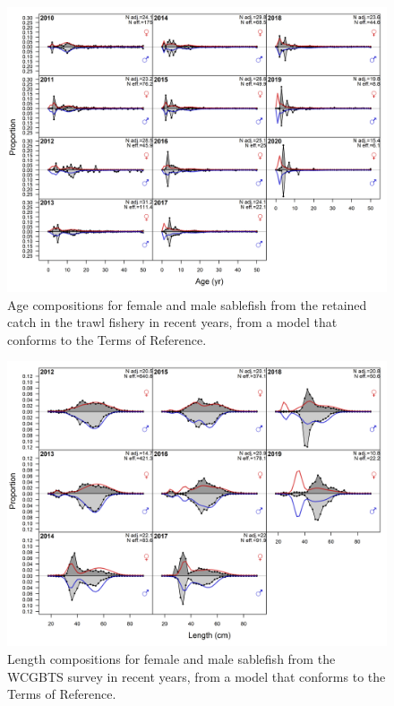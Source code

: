 \documentclass[11pt,
  english,
  a4paper,
]{article}
\begin{document}
\tagmcend\tagstructend


\begin{figure}
\centering
\includegraphics[width=1\textwidth,height=1\textheight]{figs/tora_fleet3_agecomps.png}
\caption{Age compositions for female and male sablefish from the retained catch in the trawl fishery in recent years, from a model that conforms to the Terms of Reference. \label{fig:torafleet3agecomps}}
\end{figure}

\tagmcend\tagstructend


\begin{figure}
\centering
\includegraphics[width=1\textwidth,height=1\textheight]{figs/tora_fleet8_lencomps.png}
\caption{Length compositions for female and male sablefish from the WCGBTS survey in recent years, from a model that conforms to the Terms of Reference. \label{fig:torafleet8lencomps}}
\end{figure}
\end{document}
